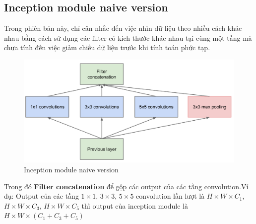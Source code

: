 \documentclass[a4paper,12pt]{report}
\begin{document}
\subsection{Inception module naive version}
Trong phiên bản này, chỉ cân nhắc đến việc nhìn dữ liệu theo nhiều cách khác nhau bằng cách sử dụng các filter có kích thước khác nhau tại cùng một tầng mà chưa tính đến việc giảm chiều dữ liệu trước khi tính toán phức tạp. 
\begin{figure}[H]
\centering
\includegraphics[scale=0.45]{inception_naive.png}
\caption{Inception module naive version}
\end{figure}
Trong đó \textbf{Filter concatenation} để gộp các output của các tầng convolution.Ví dụ: Output của các tầng $1 \times 1$, $3 \times 3$, $5 \times 5$ convolution lần lượt là $H \times W \times C_1$, $H \times W \times C_3$, $H \times W \times C_5$ thì output của inception module là $H \times W \times (C_1+C_3+C_5)$
\end{document}
